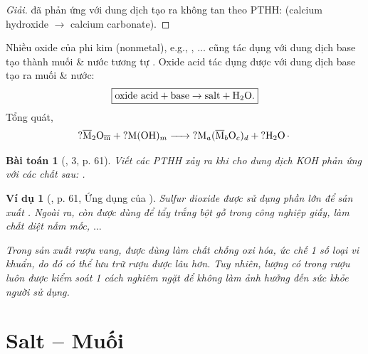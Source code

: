 \documentclass{article}
\newtheorem{baitoan}{Bài toán}
\newtheorem{vidu}{Ví dụ}
\begin{document}
\begin{proof}[Giải]
	 đã phản ứng với dung dịch  tạo ra  không tan theo PTHH:  (calcium hydroxide $\to$ calcium carbonate).
\end{proof}
Nhiều oxide của phi kim (nonmetal), e.g., , $\ldots$ cũng tác dụng với dung dịch base tạo thành muối \& nước tương tự . Oxide acid tác dụng được với dung dịch base tạo ra muối \& nước:
\begin{align}
	\label{oxide acid + base}
	\boxed{\mbox{oxide acid} + \mbox{base}\to\mbox{salt} + \ce{H2O}.}
\end{align}
Tổng quát,
\begin{align}
	\ce{$?$\overline{\rm M}2O_{\overline{m}} + $?$M(OH)_m -> $?$M_a(\overline{\rm M}_bO_c)_d + $?$H2O.}
\end{align}

\begin{baitoan}[\cite{SGK_KHTN_8_Canh_Dieu}, 3, p. 61]
	Viết các PTHH xảy ra khi cho dung dịch \emph{KOH} phản ứng với các chất sau: \emph{}.
\end{baitoan}

\begin{vidu}[\cite{SGK_KHTN_8_Canh_Dieu}, p. 61, Ứng dụng của ]
	Sulfur dioxide \emph{} được sử dụng phần lớn để sản xuất \emph{}. Ngoài ra, \emph{} còn được dùng để tẩy trắng bột gỗ trong công nghiệp giấy, làm chất diệt nấm mốc, $\ldots$
	
	Trong sản xuất rượu vang, \emph{} được dùng làm chất chống oxi hóa, ức chế 1 số loại vi khuẩn, do đó có thể lưu trữ rượu được lâu hơn. Tuy nhiên, lượng \emph{} có trong rượu luôn được kiểm soát 1 cách nghiêm ngặt để không làm ảnh hưởng đến sức khỏe người sử dụng.
\end{vidu}

\noindent{}


\section{Salt -- Muối}
\end{document}
